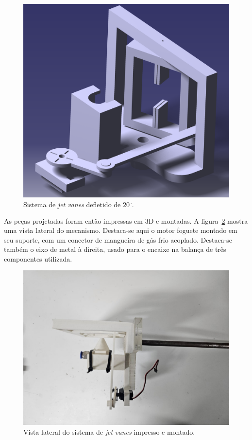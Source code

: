 \begin{figure}[htbp]
    \centering
    \includegraphics[width=\textwidth]{img/tvc_assembly_render2.png}
    \caption{Sistema de \textit{jet vanes} defletido de \(20\mathrm{^\circ}\).}\label{fig:jet_vanes_render2}
\end{figure}

As peças projetadas foram então impressas em 3D e montadas. A figura~\ref{fig:jet_vanes_assembly_side} mostra uma vista lateral do mecanismo. Destaca-se aqui o motor foguete montado em seu suporte, com um conector de mangueira de gás frio acoplado. Destaca-se também o eixo de metal à direita, usado para o encaixe na balança de três componentes utilizada.

\begin{figure}[htbp]
    \centering
    \includegraphics[width=\textwidth]{img/tvc_assembly_left.jpeg}
    \caption{Vista lateral do sistema de \textit{jet vanes} impresso e montado.}\label{fig:jet_vanes_assembly_side}
\end{figure}


